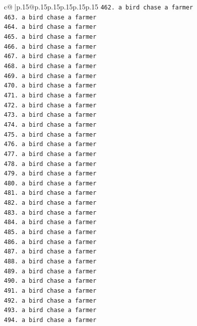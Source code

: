 \documentclass{article}
\begin{document}
{\begin{supertabular}{c@{$\;$}|p{.15\linewidth}@{}p{.15\linewidth}p{.15\linewidth}p{.15\linewidth}p{.15\linewidth}p{.15\linewidth}}
{{{\texttt{462. a bird chase a farmer} \\
\texttt{463. a bird chase a farmer} \\
\texttt{464. a bird chase a farmer} \\
\texttt{465. a bird chase a farmer} \\
\texttt{466. a bird chase a farmer} \\
\texttt{467. a bird chase a farmer} \\
\texttt{468. a bird chase a farmer} \\
\texttt{469. a bird chase a farmer} \\
\texttt{470. a bird chase a farmer} \\
\texttt{471. a bird chase a farmer} \\
\texttt{472. a bird chase a farmer} \\
\texttt{473. a bird chase a farmer} \\
\texttt{474. a bird chase a farmer} \\
\texttt{475. a bird chase a farmer} \\
\texttt{476. a bird chase a farmer} \\
\texttt{477. a bird chase a farmer} \\
\texttt{478. a bird chase a farmer} \\
\texttt{479. a bird chase a farmer} \\
\texttt{480. a bird chase a farmer} \\
\texttt{481. a bird chase a farmer} \\
\texttt{482. a bird chase a farmer} \\
\texttt{483. a bird chase a farmer} \\
\texttt{484. a bird chase a farmer} \\
\texttt{485. a bird chase a farmer} \\
\texttt{486. a bird chase a farmer} \\
\texttt{487. a bird chase a farmer} \\
\texttt{488. a bird chase a farmer} \\
\texttt{489. a bird chase a farmer} \\
\texttt{490. a bird chase a farmer} \\
\texttt{491. a bird chase a farmer} \\
\texttt{492. a bird chase a farmer} \\
\texttt{493. a bird chase a farmer} \\
\texttt{494. a bird chase a farmer} \\
}}}
\end{supertabular}}
\end{document}
